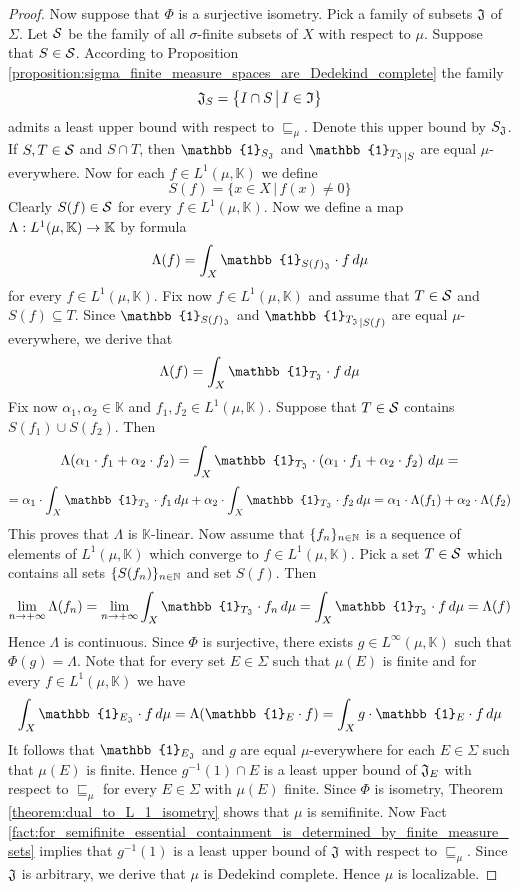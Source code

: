 \begin{proof}
  Now suppose that $\Phi$ is a surjective isometry. Pick a family of subsets ${\mathfrak J}$ of $\Sigma$. Let ${\mathcal S}$ be the family of all $\sigma$-finite subsets of $X$ with respect to $\mu$. Suppose that $S \in {\mathcal S}$. According to Proposition \ref{proposition:sigma_finite_measure_spaces_are_Dedekind_complete} the family
  $${\mathfrak J}_S = \big\{I\cap S\,\big|\,I\in {\mathfrak I}\big\}$$
  admits a least upper bound with respect to $\sqsubseteq_{\mu}$. Denote this upper bound by $S_{{\mathfrak J}}$. If $S,T \in {\mathcal S}$ and $S \cap T$, then $\mathbb{1}_{S_{\fJ}}$ and ${\mathbb{1}_{T_{\fJ}}}_{\mid S}$ are equal $\mu$-everywhere. Now for each $f \in L^1(\mu,\mathbb{K})$ we define
  $$S(f) = \big\{x\in X\,\big|\,f(x) \neq 0\big\}$$
  Clearly $S(f) \in {\mathcal S}$ for every $f \in L^1(\mu,\mathbb{K})$. Now we define a map $\Lambda:L^1(\mu,\mathbb{K})\rightarrow \mathbb{K}$ by formula
  $$\Lambda(f) = \int_X\mathbb{1}_{S(f)_{\fJ}}\cdot f\,d\mu$$
  for every $f \in L^1(\mu,\mathbb{K})$. Fix now $f \in L^1(\mu,\mathbb{K})$ and assume that $T \in {\mathcal S}$ and $S(f) \subseteq T$. Since $\mathbb{1}_{S(f)_{\fJ}}$ and ${\mathbb{1}_{T_{\fJ}}}_{\mid S(f)}$ are equal $\mu$-everywhere, we derive that
  $$\Lambda(f) = \int_X\mathbb{1}_{T_{\fJ}}\cdot f\,d\mu$$
  Fix now $\alpha_1,\alpha_2 \in \mathbb{K}$ and $f_1,f_2\in L^1(\mu,\mathbb{K})$. Suppose that $T \in {\mathcal S}$ contains $S(f_1)\cup S(f_2)$. Then 
  $$\Lambda(\alpha_1\cdot f_1 + \alpha_2\cdot f_2) = \int_X\mathbb{1}_{T_{\fJ}}\cdot \left(\alpha_1\cdot f_1 + \alpha_2\cdot f_2\right)\,d\mu = $$
  $$=\alpha_1\cdot \int_X \mathbb{1}_{T_{\fJ}}\cdot f_1\,d\mu + \alpha_2\cdot \int_X \mathbb{1}_{T_{\fJ}}\cdot f_2\,d\mu = \alpha_1\cdot \Lambda(f_1) + \alpha_2\cdot \Lambda(f_2)$$
  This proves that $\Lambda$ is $\mathbb{K}$-linear. Now assume that $\{f_n\}_{n\in {\mathbb N}}$ is a sequence of elements of $L^1(\mu,\mathbb{K})$ which converge to $f \in L^1(\mu,\mathbb{K})$. Pick a set $T \in {\mathcal S}$ which contains all sets $\{S(f_n)\}_{n \in {\mathbb N}}$ and set $S(f)$. Then
  $$\lim_{n\ra +\infty}\Lambda(f_n) = \lim_{n\ra +\infty}\int_X \mathbb{1}_{T_{\fJ}}\cdot f_n\,d\mu = \int_X \mathbb{1}_{T_{\fJ}}\cdot f\,d\mu = \Lambda(f)$$
  Hence $\Lambda$ is continuous. Since $\Phi$ is surjective, there exists $g \in L^{\infty}(\mu,\mathbb{K})$ such that $\Phi(g) = \Lambda$. Note that for every set $E \in \Sigma$ such that $\mu(E)$ is finite and for every $f \in L^1(\mu,\mathbb{K})$ we have
  $$\int_X\mathbb{1}_{E_{\fJ}}\cdot f\,d\mu= \Lambda(\mathbb{1}_E\cdot f) = \int_Xg\cdot \mathbb{1}_E\cdot f\,d\mu$$
  It follows that $\mathbb{1}_{E_{\fJ}}$ and $g$ are equal $\mu$-everywhere for each $E\in \Sigma$ such that $\mu(E)$ is finite. Hence $g^{-1}(1)\cap E$ is a least upper bound of ${\mathfrak J}_E$ with respect to $\sqsubseteq_{\mu}$ for every $E\in \Sigma$ with $\mu(E)$ finite. Since $\Phi$ is isometry, Theorem \ref{theorem:dual_to_L_1_isometry} shows that $\mu$ is semifinite. Now Fact \ref{fact:for_semifinite_essential_containment_is_determined_by_finite_measure_sets} implies that $g^{-1}(1)$ is a least upper bound of ${\mathfrak J}$ with respect to $\sqsubseteq_{\mu}$. Since ${\mathfrak J}$ is arbitrary, we derive that $\mu$ is Dedekind complete. Hence $\mu$ is localizable.
\end{proof}

